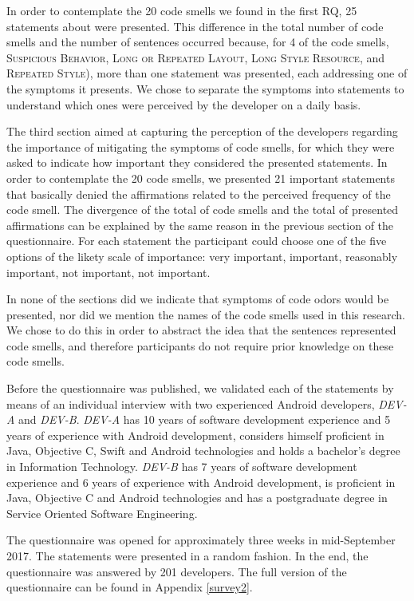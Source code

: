 In order to contemplate the 20 code smells we found in the first RQ, 25 statements about were presented. This difference in the total number of code smells and the number of sentences occurred because, for 4 of the code smells, \textsc{Suspicious Behavior}, 
\textsc{Long or Repeated Layout}, \textsc{Long Style Resource}, and \textsc{Repeated Style}), more than one statement was presented, each addressing one of the symptoms it presents. We chose to separate the symptoms into statements to understand which ones were perceived by the developer on a daily basis. 


The third section aimed at capturing the perception of the developers regarding the importance of mitigating the symptoms of code smells, for which they were asked to indicate how important they considered the presented statements. In order to contemplate the 20 code smells, we presented 21 important statements that basically denied the affirmations related to the perceived frequency of the code smell. The divergence of the total of code smells and the total of presented affirmations can be explained by the same reason in the previous section of the questionnaire. For each statement the participant could choose one of the five options of the likety scale of importance: very important, important, reasonably important, not important, not important.

In none of the sections did we indicate that symptoms of code odors would be presented, nor did we mention the names of the code smells used in this research. We chose to do this in order to abstract the idea that the sentences represented code smells, and therefore participants do not require prior knowledge on these code smells.

Before the questionnaire was published, we validated each of the statements by means of an individual interview with two experienced Android developers, \emph{DEV-A} and \emph{DEV-B}. 
\emph{DEV-A} has 10 years of software development experience and 5 years of experience with Android development, considers himself proficient in Java, Objective C, Swift and Android technologies and holds a bachelor's degree in Information Technology. \emph {DEV-B} has 7 years of software development experience and 6 years of experience with Android development, is proficient in Java, Objective C and Android technologies and has a postgraduate degree in Service Oriented Software Engineering. 

The questionnaire was opened for approximately three weeks in mid-September 2017. The statements were presented in a random fashion. In the end, the questionnaire was answered by 201 developers. The full version of the questionnaire can be found in Appendix \ref{survey2}.


